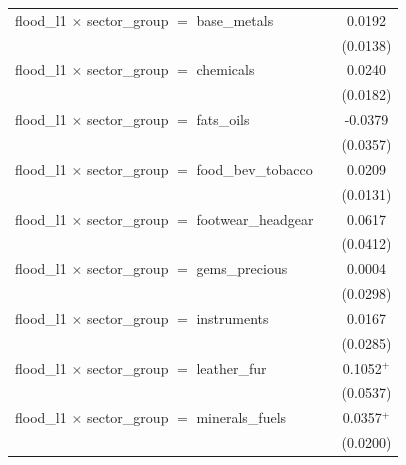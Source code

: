 \begin{tabular}{lcc}
   flood\_l1 $\times$ sector\_group $=$ base\_metals               &                       & 0.0192\\   
                                                                   &                       & (0.0138)\\   
   flood\_l1 $\times$ sector\_group $=$ chemicals                  &                       & 0.0240\\   
                                                                   &                       & (0.0182)\\   
   flood\_l1 $\times$ sector\_group $=$ fats\_oils                 &                       & -0.0379\\   
                                                                   &                       & (0.0357)\\   
   flood\_l1 $\times$ sector\_group $=$ food\_bev\_tobacco         &                       & 0.0209\\   
                                                                   &                       & (0.0131)\\   
   flood\_l1 $\times$ sector\_group $=$ footwear\_headgear         &                       & 0.0617\\   
                                                                   &                       & (0.0412)\\   
   flood\_l1 $\times$ sector\_group $=$ gems\_precious             &                       & 0.0004\\   
                                                                   &                       & (0.0298)\\   
   flood\_l1 $\times$ sector\_group $=$ instruments                &                       & 0.0167\\   
                                                                   &                       & (0.0285)\\   
   flood\_l1 $\times$ sector\_group $=$ leather\_fur               &                       & 0.1052$^{+}$\\   
                                                                   &                       & (0.0537)\\   
   flood\_l1 $\times$ sector\_group $=$ minerals\_fuels            &                       & 0.0357$^{+}$\\   
                                                                   &                       & (0.0200)\\   

\end{tabular}
